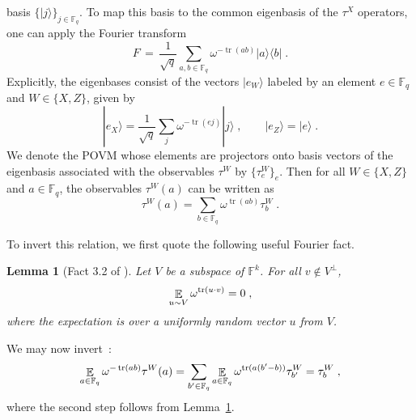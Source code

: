 \documentclass[11pt]{article}
\newtheorem{lemma}[theorem]{Lemma}
\theoremstyle{definition}
\newcommand{\ket}[1]{|#1\rangle}
\newcommand{\bra}[1]{\langle#1|}
\newcommand{\qp}{\tau}
\newcommand{\F}{\ensuremath{\mathbb{F}}}
\newcommand{\Fq}{\F_q}
\DeclareMathOperator{\tr}{tr}
\newcommand{\E}{\mathop{\mathbb{E}}\displaylimits}
\begin{document}
basis $\{\ket{j}\}_{j \in \F_q}$.
To map this basis to the common eigenbasis of the $\qp^X$ operators, one can
apply the Fourier transform
\begin{equation}
  \label{eq:fourier-f}
  F \,=\, \frac{1}{\sqrt{q}} \sum_{a, b\in \Fq} \omega^{-\tr(ab)}
  \ket{a}\bra{b}\;.
\end{equation}
Explicitly, the eigenbases consist of the vectors $\ket{e_W}$ labeled by an
element $e \in \Fq$ and $W \in \{X, Z\}$, given by
\begin{equation*}
  \ket{e_X} = \frac{1}{\sqrt{q}} \sum_j \omega^{- \tr(e j)} \ket{j}\;, \qquad
  \ket{e_Z}   = \ket{e}\;.
\end{equation*}
We denote the POVM whose elements are projectors onto basis vectors of the
eigenbasis associated with the observables $\qp^W$ by $\{\qp^W_e\}_e$.
Then for all $W \in \{X,Z\}$ and $a\in \Fq$, the observables $\qp^W(a)$ can be
written as
\begin{equation}\label{eq:pauli-obs-proj-single}
  \qp^W(a) = \sum_{b \in \Fq} \omega^{\tr(a b)} \qp^W_b\;.
\end{equation}

To invert this relation, we first quote the following useful Fourier fact.
\begin{lemma}[Fact 3.2 of \cite{NW19}]
  \label{lem:cancellation}
  Let $V$ be a subspace of $\F^k$. For all $v \not\in V^\perp$, 
  \begin{equation*}
    \E_{u \sim V} \omega^{\tr(u \cdot v)} = 0\;,
  \end{equation*}
  where the expectation is over a uniformly random vector $u$ from $V$.
\end{lemma}

We may now invert~:
\begin{equation}\label{eq:pauli-inversion-0-single}
  \E_{a\in \F_q} \omega^{-\tr(ab)} \qp^W(a) = \sum_{b'\in \F_q} \E_{a\in \F_q}
  \omega^{\tr(a(b'-b))} \qp^W_{b'} = \qp^W_b\;,
\end{equation}
where the second step follows from Lemma~\ref{lem:cancellation}.
\end{document}
